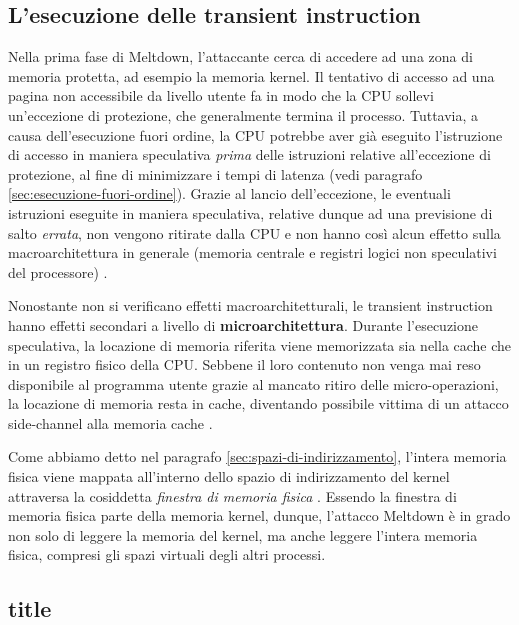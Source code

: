 \subsection{L'esecuzione delle transient instruction}
Nella prima fase di Meltdown, l'attaccante cerca di accedere ad una zona di memoria protetta, ad esempio la memoria kernel.
Il tentativo di accesso ad una pagina non accessibile da livello utente fa in modo che la CPU sollevi un'eccezione di protezione, che generalmente termina il processo. 
Tuttavia, a causa dell'esecuzione fuori ordine, la CPU potrebbe aver già eseguito l'istruzione di accesso in maniera speculativa \emph{prima} delle istruzioni relative all'eccezione di protezione, al fine di minimizzare i tempi di latenza (vedi paragrafo \ref{sec:esecuzione-fuori-ordine}).
Grazie al lancio dell'eccezione, le eventuali istruzioni eseguite in maniera speculativa, relative dunque ad una previsione di salto \emph{errata}, non vengono ritirate dalla CPU e non hanno così alcun effetto sulla macroarchitettura in generale (memoria centrale e registri logici non speculativi del processore) \cite{frosini:calcolatori2}.

Nonostante non si verificano effetti macroarchitetturali, le transient instruction hanno effetti secondari a livello di \textbf{microarchitettura}. 
Durante l'esecuzione speculativa, la locazione di memoria riferita viene memorizzata sia nella cache che in un registro fisico della CPU. 
Sebbene il loro contenuto non venga mai reso disponibile al programma utente grazie al mancato ritiro delle micro-operazioni, la locazione di memoria resta in cache, diventando possibile vittima di un attacco side-channel alla memoria cache \cite{lipp:meltdown}.

Come abbiamo detto nel paragrafo \ref{sec:spazi-di-indirizzamento}, l'intera memoria fisica viene mappata all'interno dello spazio di indirizzamento del kernel attraversa la cosiddetta \emph{finestra di memoria fisica} \cite{lettieri:paginazione-complementi}.
Essendo la finestra di memoria fisica parte della memoria kernel, dunque, l'attacco Meltdown è in grado non solo di leggere la memoria del kernel, ma anche leggere l'intera memoria fisica, compresi gli spazi virtuali degli altri processi.

\subsection{title}
\label{sec:seconda-fase-meltdown}
